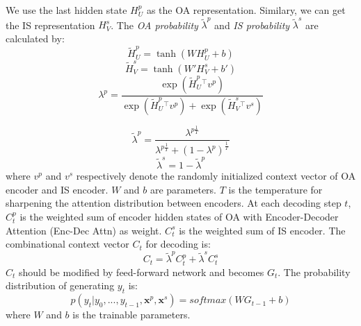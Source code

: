 {We use the last hidden state $H^p_U$ as the OA representation.
Similary, we can get the IS representation $H^s_V$.
The {\em OA probability} $	\widetilde{\lambda}^p$ and 
{\em IS probability} $	\widetilde{\lambda}^s$ are calculated by:
\begin{equation}
	\widetilde{H}^p_U = \tanh(WH^p_U+b) 
\end{equation}
\begin{equation}
	\widetilde{H}^s_V = \tanh(W'H^s_V+b') 
\end{equation}
\begin{equation}
    \lambda^p = \frac{\exp(\widetilde{H}^p_U {^\top} v^p)}{\exp(\widetilde{H}^p_U {^\top} v^p)+\exp(\widetilde{H}^s_V {^\top} v^s)} 
\end{equation}

\begin{equation}
	\widetilde{\lambda}^p =\frac{ \lambda^{p\frac{1}{T}}}{\lambda^{p\frac{1}{T}}+(1-\lambda^p)^{\frac{1}{T}}}
	\label{eq:T}
\end{equation}
\begin{equation}
	\widetilde{\lambda}^s =1-\widetilde{\lambda}^p 
\end{equation}
where $v^p$ and $v^s$ respectively denote the randomly initialized context vector of OA encoder and IS encoder.
$W$ and $b$ are parameters. $T$ is the temperature for sharpening the attention distribution between encoders.
At each decoding step $t$, 
$C_t^p$ is the weighted sum of encoder hidden states of OA with Encoder-Decoder Attention (Enc-Dec Attn) as weight. 
$C_t^s$ is the weighted sum of IS encoder.
The combinational context vector $C_t$ for decoding is:
\begin{equation}
	C_t = \widetilde{\lambda}^p C_t^p +  \widetilde{\lambda}^s C_t^s
\end{equation}
$C_t$ should be modified by feed-forward network and becomes $G_t$. 
The probability distribution of generating $y_t$ is:
\begin{equation}
p(y_t|y_0,...,y_{t-1}, \textbf{x}^p,\textbf{x}^s)=softmax(WG_{t-1}+b)
\end{equation}
where $W$ and $b$ is the trainable parameters.

}

